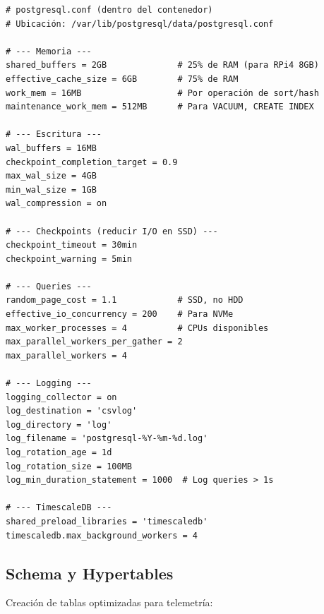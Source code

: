 \begin{verbatim}
# postgresql.conf (dentro del contenedor)
# Ubicación: /var/lib/postgresql/data/postgresql.conf

# --- Memoria ---
shared_buffers = 2GB              # 25% de RAM (para RPi4 8GB)
effective_cache_size = 6GB        # 75% de RAM
work_mem = 16MB                   # Por operación de sort/hash
maintenance_work_mem = 512MB      # Para VACUUM, CREATE INDEX

# --- Escritura ---
wal_buffers = 16MB
checkpoint_completion_target = 0.9
max_wal_size = 4GB
min_wal_size = 1GB
wal_compression = on

# --- Checkpoints (reducir I/O en SSD) ---
checkpoint_timeout = 30min
checkpoint_warning = 5min

# --- Queries ---
random_page_cost = 1.1            # SSD, no HDD
effective_io_concurrency = 200    # Para NVMe
max_worker_processes = 4          # CPUs disponibles
max_parallel_workers_per_gather = 2
max_parallel_workers = 4

# --- Logging ---
logging_collector = on
log_destination = 'csvlog'
log_directory = 'log'
log_filename = 'postgresql-%Y-%m-%d.log'
log_rotation_age = 1d
log_rotation_size = 100MB
log_min_duration_statement = 1000  # Log queries > 1s

# --- TimescaleDB ---
shared_preload_libraries = 'timescaledb'
timescaledb.max_background_workers = 4
\end{verbatim}

\subsection{Schema y Hypertables}

Creación de tablas optimizadas para telemetría:

